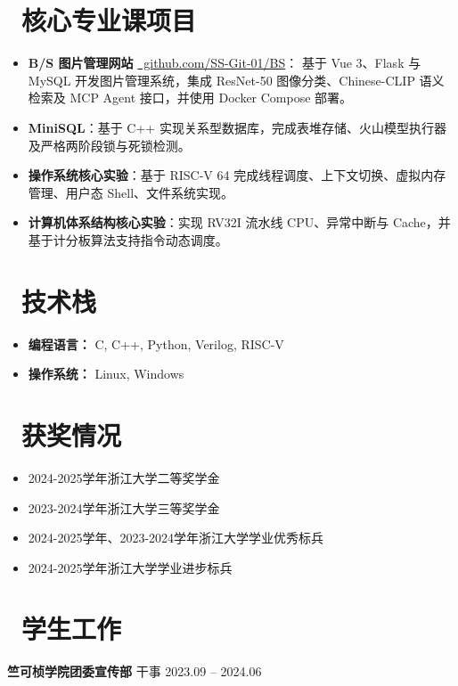 \documentclass[11pt]{article}
\newlength{\intraProjectListTopSep}
\begin{document}
\section{\makebox[\widthof{\faLaptop}][c]{\color{CVBlue}\faLaptop}\ 核心专业课项目}
\begin{itemize}[nosep, topsep=\intraProjectListTopSep, parsep=0.5ex]
    \item \textbf{B/S 图片管理网站}
    \href{https://github.com/SS-Git-01/BS}
    {\small\faGithub\ github.com/SS-Git-01/BS}：
    基于 Vue 3、Flask 与 MySQL 开发图片管理系统，集成 ResNet-50 图像分类、Chinese-CLIP 语义检索及 MCP Agent 接口，并使用 Docker Compose 部署。
    \item \textbf{MiniSQL}：基于 C++ 实现关系型数据库，完成表堆存储、火山模型执行器及严格两阶段锁与死锁检测。
    \item \textbf{操作系统核心实验}：基于 RISC-V 64 完成线程调度、上下文切换、虚拟内存管理、用户态 Shell、文件系统实现。
    \item \textbf{计算机体系结构核心实验}：实现 RV32I 流水线 CPU、异常中断与 Cache，并基于计分板算法支持指令动态调度。
\end{itemize}

\section{\makebox[\widthof{\faCogs}][c]{\color{CVBlue}\faCogs}\ 技术栈}
\begin{itemize}[nosep]
    \item \textbf{编程语言：} C, C++, Python, Verilog, RISC-V
    \item \textbf{操作系统：} Linux, Windows
\end{itemize}

\section{\makebox[\widthof{\faGraduationCap}][c]{\color{CVBlue}\faList}\ 获奖情况}
\begin{itemize}
    \item 2024-2025学年浙江大学二等奖学金 
    \item 2023-2024学年浙江大学三等奖学金 
    \item 2024-2025学年、2023-2024学年浙江大学学业优秀标兵
    \item 2024-2025学年浙江大学学业进步标兵
    
\end{itemize}
    
\section{\makebox[\widthof{\faFlag}][c]{\color{CVBlue}\faFlag}\ 学生工作}
\textbf{竺可桢学院团委宣传部} \quad 干事 \hfill 2023.09 -- 2024.06
\end{document}
